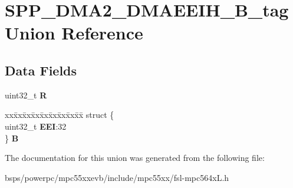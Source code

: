 \hypertarget{unionSPP__DMA2__DMAEEIH__32B__tag}{}\section{S\+P\+P\+\_\+\+D\+M\+A2\+\_\+\+D\+M\+A\+E\+E\+I\+H\+\_\+B\+\_\+tag Union Reference}
\label{unionSPP__DMA2__DMAEEIH__32B__tag}
\subsection*{Data Fields}
\begin{DoxyCompactItemize}
\item 
\mbox{\label{unionSPP__DMA2__DMAEEIH__32B__tag_ac9d96717c66a394401b5391165c74a55}} 
uint32\+\_\+t {\bfseries R}
\item 
\mbox{\label{unionSPP__DMA2__DMAEEIH__32B__tag_a6fa667d9ed59fa40b9fe00c8f34147f2}} 
\begin{tabbing}
xx\=xx\=xx\=xx\=xx\=xx\=xx\=xx\=xx\=\kill
struct \{\\
\>uint32\_t {\bfseries EEI}:32\\
\} {\bfseries B}\\

\end{tabbing}\end{DoxyCompactItemize}


The documentation for this union was generated from the following file\+:\begin{DoxyCompactItemize}
\item 
bsps/powerpc/mpc55xxevb/include/mpc55xx/fsl-\/mpc564x\+L.\+h\end{DoxyCompactItemize}
